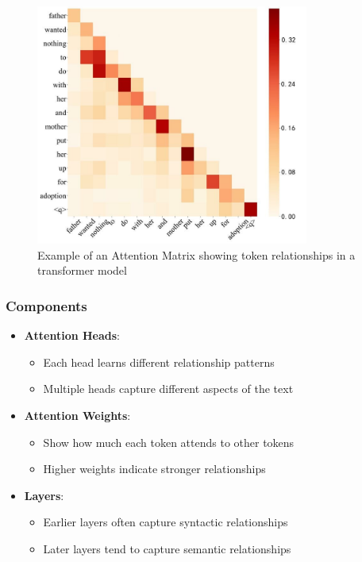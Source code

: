 \documentclass{article}
\begin{document}
\begin{figure}[h]
    \centering
    \includegraphics[width=0.8\textwidth]{images/am.jpg}
    \caption{Example of an Attention Matrix showing token relationships in a transformer model}
    \label{fig:attention_matrix}
\end{figure}

\subsubsection{Components}
\begin{itemize}
    \item \textbf{Attention Heads}:
        \begin{itemize}
            \item Each head learns different relationship patterns
            \item Multiple heads capture different aspects of the text
        \end{itemize}
    \item \textbf{Attention Weights}:
        \begin{itemize}
            \item Show how much each token attends to other tokens
            \item Higher weights indicate stronger relationships
        \end{itemize}
    \item \textbf{Layers}:
        \begin{itemize}
            \item Earlier layers often capture syntactic relationships
            \item Later layers tend to capture semantic relationships
        \end{itemize}
\end{itemize}
\end{document}
